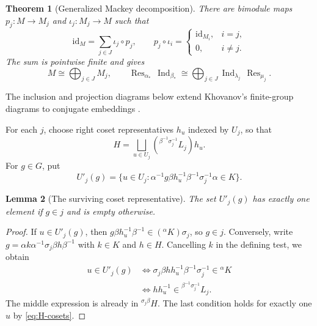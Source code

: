 \documentclass[11pt,a4paper]{article}
\numberwithin{equation}{section}
\newtheorem{theorem}{Theorem}[section]
\newtheorem{lemma}[theorem]{Lemma}
\theoremstyle{definition}
\newcommand{\id}{\mathrm{id}}
\newcommand{\Ind}{\operatorname{Ind}}
\newcommand{\Res}{\operatorname{Res}}
\newcommand{\cg}[2]{{}^{#1}\!#2}
\begin{document}
\begin{theorem}[Generalized Mackey decomposition]\label{thm:mackey}
There are bimodule maps \(p_j:M\to M_j\) and \(\iota_j:M_j\to M\) such that
\begin{equation}\label{eq:split}
   \id_M=\sum_{j\in J}\iota_j\circ p_j,\qquad
   p_j\circ\iota_i=
   \begin{cases}
     \id_{M_i},&i=j,\\
     0,&i\ne j.
   \end{cases}
\end{equation}
The sum is pointwise finite and gives
\[
 M\cong\bigoplus_{j\in J}M_j,\qquad
 \Res_{\alpha_*}\,\Ind_{\beta_*}
   \cong\bigoplus_{j\in J}\Ind_{\lambda_j}\,\Res_{\mu_j}.
\]
\end{theorem}

The inclusion and projection diagrams below extend Khovanov's
finite-group diagrams to conjugate embeddings \cite[Prop.~6]{khovanov}.

For each \(j\), choose right coset representatives \(h_u\) indexed by
\(U_j\), so that
\begin{equation}\label{eq:H-cosets}
 H=\bigsqcup_{u\in U_j}(\cg{\beta^{-1}\sigma_j^{-1}}{L_j})h_u .
\end{equation}
For \(g\in G\), put
\[
 U'_j(g)=\{u\in U_j:
   \alpha^{-1}g\beta h_u^{-1}\beta^{-1}\sigma_j^{-1}\alpha\in K\}.
\]

\begin{lemma}[The surviving coset representative]\label{lem:first-filter}
The set \(U'_j(g)\) has exactly one element if \(g\in j\) and is
empty otherwise.
\end{lemma}

\begin{proof}
If \(u\in U'_j(g)\), then
\(g\beta h_u^{-1}\beta^{-1}\in(\cg{\alpha}{K})\sigma_j\), so \(g\in j\).
Conversely, write \(g=\alpha k\alpha^{-1}\sigma_j\beta h\beta^{-1}\)
with \(k\in K\) and \(h\in H\). Cancelling \(k\) in the defining test,
we obtain
\[
 \begin{aligned}
 u\in U'_j(g)
 &\iff \sigma_j\beta h h_u^{-1}\beta^{-1}\sigma_j^{-1}\in\cg{\alpha}{K}\\
 &\iff h h_u^{-1}\in\cg{\beta^{-1}\sigma_j^{-1}}{L_j}.
 \end{aligned}
\]
The middle expression is already in \(\cg{\sigma_j\beta}{H}\).
The last condition holds for exactly one \(u\) by \eqref{eq:H-cosets}.
\end{proof}
\end{document}

